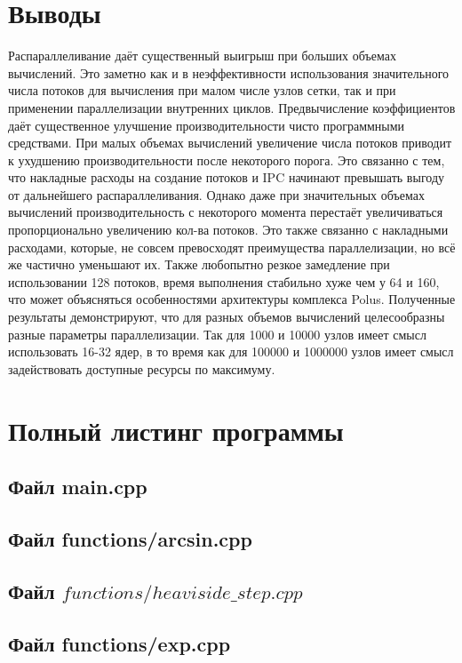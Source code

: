 \documentclass[a4paper,12pt,titlepage,finall]{article}
\begin{document}
\section{Выводы}
Распараллеливание даёт существенный выигрыш при больших объемах вычислений. Это заметно как и в неэффективности использования значительного числа потоков для вычисления при малом числе узлов сетки, так и при применении параллелизации внутренних циклов. Предвычисление коэффициентов даёт существенное улучшение производительности чисто программными средствами. При малых объемах вычислений увеличение числа потоков приводит к ухудшению производительности после некоторого порога. Это связанно с тем, что накладные расходы на создание потоков и IPC начинают превышать выгоду от дальнейшего распараллеливания. Однако даже при значительных объемах вычислений производительность с некоторого момента перестаёт увеличиваться пропорционально увеличению кол-ва потоков. Это также связанно с накладными расходами, которые, не совсем превосходят преимущества параллелизации, но всё же частично уменьшают их. Также любопытно резкое замедление при использовании 128 потоков, время выполнения стабильно хуже чем у 64 и 160, что может объясняться особенностями архитектуры комплекса Polus. Полученные результаты демонстрируют, что для разных объемов вычислений целесообразны разные параметры параллелизации. Так для 1000 и 10000 узлов имеет смысл использовать 16-32 ядер, в то время как для 100000 и 1000000 узлов имеет смысл задействовать доступные ресурсы по максимуму. 
\newpage
\section{Полный листинг программы} \label{source}
\subsection{Файл main.cpp}

\subsection{Файл functions/arcsin.cpp}

\subsection{Файл $functions/heaviside\_step.cpp$}

\subsection{Файл functions/exp.cpp}

\end{document}
